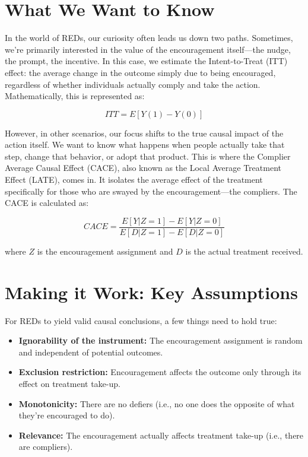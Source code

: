 \documentclass[
  letterpaper,
  DIV=11,
  numbers=noendperiod]{scrreprt}
\providecommand{\tightlist}{%
  \setlength{\itemsep}{0pt}\setlength{\parskip}{0pt}}\usepackage{longtable,booktabs,array}
\begin{document}
\section{What We Want to Know}\label{what-we-want-to-know}

In the world of REDs, our curiosity often leads us down two paths.
Sometimes, we're primarily interested in the value of the encouragement
itself---the nudge, the prompt, the incentive. In this case, we estimate
the Intent-to-Treat (ITT) effect: the average change in the outcome
simply due to being encouraged, regardless of whether individuals
actually comply and take the action. Mathematically, this is represented
as:

\[ITT = E[Y(1) - Y(0)]\]

However, in other scenarios, our focus shifts to the true causal impact
of the action itself. We want to know what happens when people actually
take that step, change that behavior, or adopt that product. This is
where the Complier Average Causal Effect (CACE), also known as the Local
Average Treatment Effect (LATE), comes in. It isolates the average
effect of the treatment specifically for those who are swayed by the
encouragement---the compliers. The CACE is calculated as:

\[CACE = \frac{E[Y|Z=1] - E[Y|Z=0]}{E[D|Z=1] - E[D|Z=0]}\]

where \(Z\) is the encouragement assignment and \(D\) is the actual
treatment received.

\section{Making it Work: Key
Assumptions}\label{making-it-work-key-assumptions}

For REDs to yield valid causal conclusions, a few things need to hold
true:

\begin{itemize}
\tightlist
\item
  \textbf{Ignorability of the instrument:} The encouragement assignment
  is random and independent of potential outcomes.
\item
  \textbf{Exclusion restriction:} Encouragement affects the outcome only
  through its effect on treatment take-up.
\item
  \textbf{Monotonicity:} There are no defiers (i.e., no one does the
  opposite of what they're encouraged to do).
\item
  \textbf{Relevance:} The encouragement actually affects treatment
  take-up (i.e., there are compliers).
\end{itemize}
\end{document}
